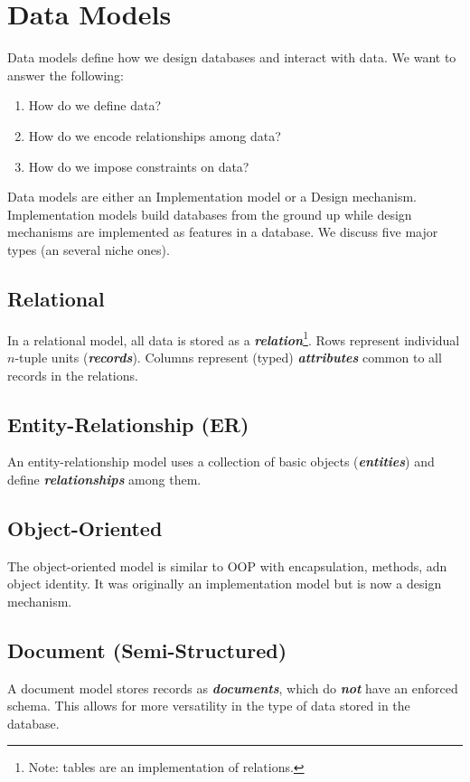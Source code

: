 \documentclass{report}
\renewcommand{\it}[1]{\textit{{#1}}}
\newcommand{\ib}[1]{\textit{\textbf{{#1}}}}
\begin{document}
\section{Data Models}
Data models define how we design databases and interact with data. We want to answer the following:
\begin{enumerate}[label=\it{(\roman*)}]
    \item How do we define data?
    \item How do we encode relationships among data?
    \item How do we impose constraints on data?
\end{enumerate}
Data models are either an Implementation model or a Design mechanism. Implementation models build 
databases from the ground up while design mechanisms are implemented as features in a database. We 
discuss five major types (an several niche ones).

\subsection{Relational}
In a relational model, all data is stored as a \ib{relation}\footnote{Note: tables are an 
implementation of relations.}. Rows represent individual $n$-tuple units (\ib{records}). Columns 
represent (typed) \ib{attributes} common to all records in the relations.

\subsection{Entity-Relationship (ER)}
An entity-relationship model uses a collection of basic objects (\ib{entities}) and define 
\ib{relationships} among them.

\subsection{Object-Oriented}
The object-oriented model is similar to OOP with encapsulation, methods, adn object identity. It
was originally an implementation model but is now a design mechanism.

\subsection{Document (Semi-Structured)}
A document model stores records as \ib{documents}, which do \ib{not} have an enforced schema. This 
allows for more versatility in the type of data stored in the database.
\end{document}

